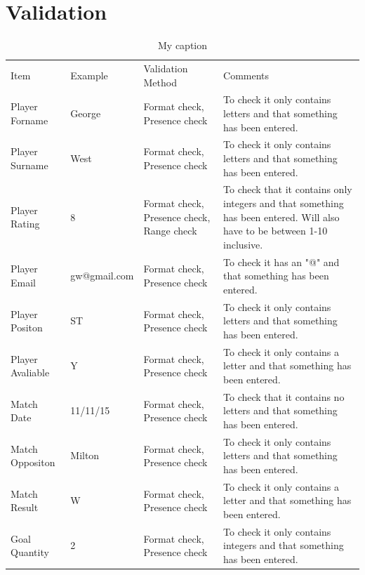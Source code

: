 \section{Validation}
\begin{table}[]
	\centering
	\caption{My caption}
	\label{my-label}
	\begin{tabular}{llll}
		Item             & Example      & Validation Method                         & Comments                                                                                                                  \\
		Player Forname   & George       & Format check, Presence check              & To check it only contains letters and that something has been entered.                                                    \\
		Player Surname   & West         & Format check, Presence check              & To check it only contains letters and that something has been entered.                                                    \\
		Player Rating    & 8            & Format check, Presence check, Range check & To check that it contains only integers and that something has been entered. Will also have to be between 1-10 inclusive. \\
		Player Email     & gw@gmail.com & Format check, Presence check              & To check it has an "@" and that something has been entered.                                                               \\
		Player Positon   & ST           & Format check, Presence check              & To check it only contains letters and that something has been entered.                                                    \\
		Player Avaliable & Y            & Format check, Presence check              & To check it only contains a letter and that something has been entered.                                                   \\
		Match Date       & 11/11/15     & Format check, Presence check              & To check that it contains no letters and that something has been entered.                                                 \\
		Match Oppositon  & Milton       & Format check, Presence check              & To check it only contains letters and that something has been entered.                                                    \\
		Match Result     & W            & Format check, Presence check              & To check it only contains a letter and that something has been entered.                                                   \\
		Goal Quantity    & 2            & Format check, Presence check              & To check it only contains integers and that something has been entered.                                                  
	\end{tabular}
\end{table}
